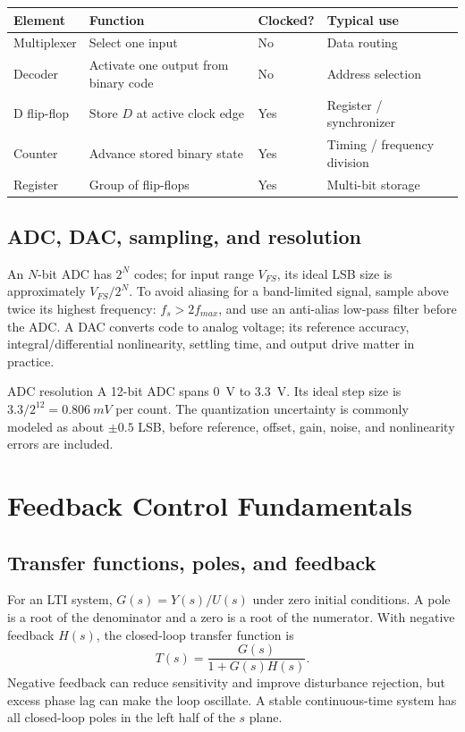 \documentclass[10pt]{article}
\begin{document}
\begin{center}
\begin{tabular}{llll}
\toprule
Element & Function & Clocked? & Typical use \\
\midrule
Multiplexer & Select one input & No & Data routing \\
Decoder & Activate one output from binary code & No & Address selection \\
D flip-flop & Store $D$ at active clock edge & Yes & Register / synchronizer \\
Counter & Advance stored binary state & Yes & Timing / frequency division \\
Register & Group of flip-flops & Yes & Multi-bit storage \\
\bottomrule
\end{tabular}
\end{center}

\subsection{ADC, DAC, sampling, and resolution}
An $N$-bit ADC has $2^N$ codes; for input range $V_{FS}$, its ideal LSB size is
approximately $V_{FS}/2^N$. To avoid aliasing for a band-limited signal, sample
above twice its highest frequency: $f_s>2f_{max}$, and use an anti-alias low-pass
filter before the ADC. A DAC converts code to analog voltage; its reference
accuracy, integral/differential nonlinearity, settling time, and output drive
matter in practice.

\begin{examplebox}{ADC resolution}
A 12-bit ADC spans \SI{0}{V} to \SI{3.3}{V}. Its ideal step size is
$3.3/2^{12}=\SI{0.806}{mV}$ per count. The quantization uncertainty is commonly
modeled as about $\pm0.5$ LSB, before reference, offset, gain, noise, and
nonlinearity errors are included.
\end{examplebox}

\section{Feedback Control Fundamentals}

\subsection{Transfer functions, poles, and feedback}
For an LTI system, $G(s)=Y(s)/U(s)$ under zero initial conditions. A pole is a
root of the denominator and a zero is a root of the numerator. With negative
feedback $H(s)$, the closed-loop transfer function is
\begin{equation} T(s)=\frac{G(s)}{1+G(s)H(s)}. \end{equation}
Negative feedback can reduce sensitivity and improve disturbance rejection, but
excess phase lag can make the loop oscillate. A stable continuous-time system
has all closed-loop poles in the left half of the $s$ plane.
\end{document}
